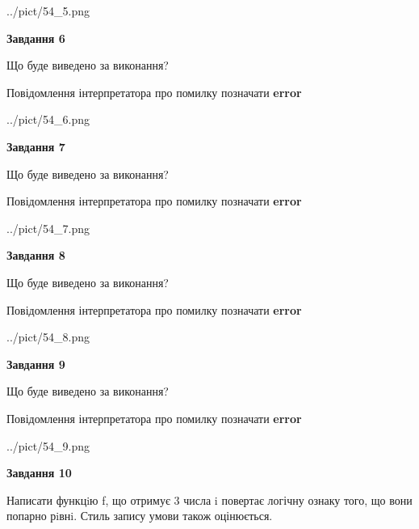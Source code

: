 \documentclass[12pt, ukrainian]{article}
\begin{document}
{\begin {large}
\begin{center}
	{../pict/54_5.png}
\end{center}
\newpage

{\begin {center}\textbf{Завдання 6}\end {center}}\par
Що буде виведено за виконання? \par
Повідомлення інтерпретатора про помилку позначати \textbf{error}

\begin{center}
	{../pict/54_6.png}
\end{center}
\newpage

{\begin {center}\textbf{Завдання 7}\end {center}}\par
Що буде виведено за виконання? \par
Повідомлення інтерпретатора про помилку позначати \textbf{error}

\begin{center}
	{../pict/54_7.png}
\end{center}
\newpage

{\begin {center}\textbf{Завдання 8}\end {center}}\par
Що буде виведено за виконання? \par
Повідомлення інтерпретатора про помилку позначати \textbf{error}

\begin{center}
	{../pict/54_8.png}
\end{center}
\newpage

{\begin {center}\textbf{Завдання 9}\end {center}}\par
Що буде виведено за виконання? \par
Повідомлення інтерпретатора про помилку позначати \textbf{error}

\begin{center}
	{../pict/54_9.png}
\end{center}
\newpage

{\begin {center}\textbf{Завдання 10}\end {center}}\par

Написати функцiю f, що отримує 3 числа i повертає логічну ознаку того, що вони попарно рiвнi. Стиль запису умови також оцінюється.\par
\newpage

\end {large}}
\end{document}
